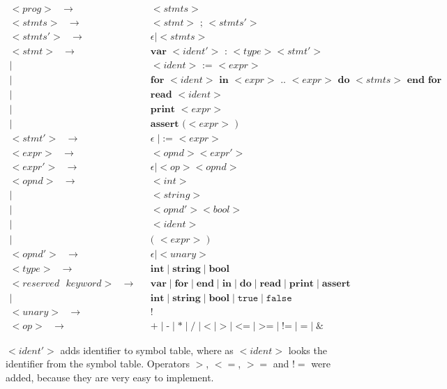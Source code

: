 \documentclass[a4paper,12pt]{article}
\newcommand{\bb}[1]{\textbf{#1}}
\newcommand{\ttt}[1]{\texttt{#1}}
\newcommand{\e}{\epsilon}
\newcommand{\s}{\ttt{ }}
\begin{document}
\begin{align*}
<prog>\s \to \s &<stmts> \\
<stmts>\s \to \s &<stmt> \bb{ ; } <stmts'> \\
<stmts'>\s \to \s &\e \mid <stmts> \\
<stmt>\s \to \s &\bb{var } <ident'> \bb{ : } <type> <stmt'> \\ 
       \mid \s &<ident> \bb{ := } <expr> \\  
       \mid \s &\bb{for } <ident> \bb{ in } <expr> \bb{ .. } <expr> \bb{ do } 
             <stmts> \bb{ end } \bb{for} \\
       \mid \s &\bb{read } <ident> \\
       \mid \s &\bb{print } <expr> \\
       \mid \s &\bb{assert (}  <expr> \bb{ )} \\
<stmt'>\s \to \s &\e \mid \bb{:= } <expr> \\
<expr>\s \to \s &<opnd> <expr'> \\
<expr'>\s \to \s &\e \mid <op> <opnd> \\
<opnd>\s \to \s &<int> \\
       \mid \s &<string> \\
       \mid \s &<opnd'><bool> \\
       \mid \s &<ident> \\
       \mid \s &\bb{( } <expr> \bb{ )} \\
<opnd'>\s \to \s &\e \mid <unary> \\
<type>\s \to \s &\bb{int} \mid \bb{string} \mid \bb{bool} \\
<reserved\s keyword>\s \to \s 
              &\bb{var} \mid \bb{for} \mid \bb{end} \mid \bb{in} \mid \bb{do}
              \mid \bb{read} \mid \bb{print} \mid \bb{assert} \\ 
              \mid \s &\bb{int} \mid \bb{string} \mid \bb{bool}  \mid \ttt{true} \mid \ttt{false}\\
<unary>\s \to \s &\bb{!} \\
<op>\s \to \s &\bb{+} \mid \bb{-} \mid \bb{*} \mid \bb{/} \mid \bb{<} \mid
\bb{>} \mid \bb{<=} \mid \bb{>=} \mid \bb{!=} \mid \bb{=} \mid\bb{\&}
\end{align*}

$<ident'>$ adds identifier to symbol table, where as $<ident>$ looks the
identifier from the symbol table. Operators $>$, $<=$, $>=$ and $!=$ were added,
because they are very easy to implement.
\end{document}
